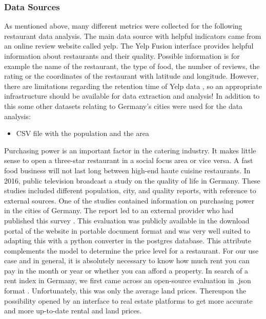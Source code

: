 \subsubsection{Data Sources}
\label{subsubsec:sources}
As mentioned above, many different metrics were collected for the following restaurant data analysis. The main data source with helpful indicators came from an online review website called yelp. The Yelp Fusion interface provides helpful information about restaurants and their quality. Possible information is for example the name of the restaurant, the type of food, the number of reviews, the rating or the coordinates of the restaurant with latitude and longitude. However, there are limitations regarding the retention time of Yelp data \cite{yelp}, so an appropriate infrastructure should be available for data extraction and analysis!
\newline
In addition to this some other datasets relating to Germany's cities were used for the data analysis:
\begin{itemize}
\item CSV file with the population and the area
\end{itemize}

Purchasing power is an important factor in the catering industry. It makes little sense to open a three-star restaurant in a social focus area or vice versa. A fast food business will not last long between high-end haute cuisine restaurants. In 2016, public television broadcast a study on the quality of life in Germany. These studies included different population, city, and quality reports, with reference to external sources. One of the studies contained information on purchasing power in the cities of Germany. The report led to an external provider who had published this survey \cite{buyingpower}. This evaluation was publicly available in the download portal of the website in portable document format and was very well suited to adapting this with a python converter in the postgres database. This attribute complements the model to determine the price level for a restaurant.
\newline
For our use case and in general, it is absolutely necessary to know how much rent you can pay in the month or year or whether you can afford a property. In search of a rent index in Germany, we first came across an open-source evaluation in .json format \cite{Sparda}. Unfortunately, this was only the average land prices. Thereupon the possibility opened by an interface to real estate platforms \cite{ImmoScout} to get more accurate and more up-to-date rental and land prices.
